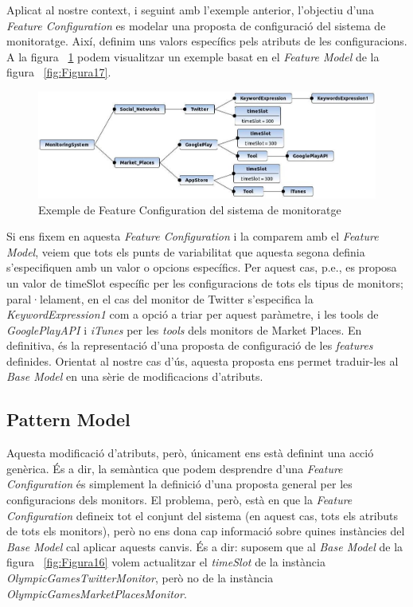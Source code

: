 Aplicat al nostre context, i seguint amb l'exemple anterior, l'objectiu d'una \textit{Feature Configuration} es modelar una proposta de configuració del sistema de monitoratge. Així, definim uns valors específics pels atributs de les configuracions. A la figura ~\ref{fig:Figura18} podem visualitzar un exemple basat en el \textit{Feature Model} de la figura ~\ref{fig:Figura17}.\\

\begin{figure}
\centering
\includegraphics[width=13cm]{Figures/Figure18}
\decoRule
\caption{Exemple de Feature Configuration del sistema de monitoratge}
\label{fig:Figura18}
\end{figure}

Si ens fixem en aquesta \textit{Feature Configuration} i la comparem amb el \textit{Feature Model}, veiem que tots els punts de variabilitat que aquesta segona definia s'especifiquen amb un valor o opcions específics. Per aquest cas, p.e., es proposa un valor de timeSlot específic per les configuracions de tots els tipus de monitors; paral·lelament, en el cas del monitor de Twitter s'especifica la \textit{KeywordExpression1} com a opció a triar per aquest paràmetre, i les tools de \textit{GooglePlayAPI} i \textit{iTunes} per les \textit{tools} dels monitors de Market Places. En definitiva, és la representació d'una proposta de configuració de les \textit{features} definides. Orientat al nostre cas d'ús, aquesta proposta ens permet traduir-les al \textit{Base Model} en una sèrie de modificacions d'atributs.\\

\subsection{Pattern Model}

Aquesta modificació d'atributs, però, únicament ens està definint una acció genèrica. És a dir, la semàntica que podem desprendre d'una \textit{Feature Configuration} és simplement la definició d'una proposta general per les configuracions dels monitors. El problema, però, està en que la \textit{Feature Configuration} defineix tot el conjunt del sistema (en aquest cas, tots els atributs de tots els monitors), però no ens dona cap informació sobre quines instàncies del \textit{Base Model} cal aplicar aquests canvis. És a dir: suposem que al \textit{Base Model} de la figura ~\ref{fig:Figura16} volem actualitzar el \textit{timeSlot} de la instància \textit{OlympicGamesTwitterMonitor}, però no de la instància \textit{OlympicGamesMarketPlacesMonitor}.\\

